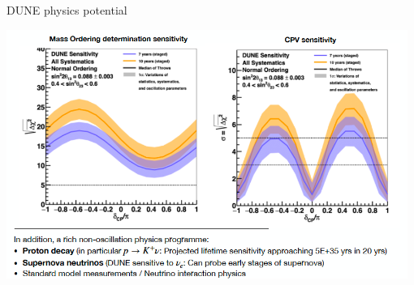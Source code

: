 \begin{frame}{DUNE physics potential}

  \begin{center}
    \includegraphics[width=0.98\textwidth]{./images/3nu/future/dune_phys_potential_page}\\
  \end{center}

%
\end{frame}




